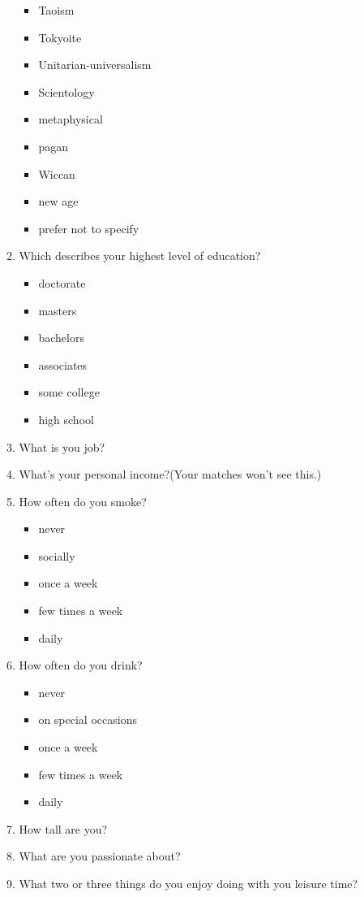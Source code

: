 \begin{appendices}
\begin{itemize}
\begin{enumerate}
\begin{itemize}
				\item Taoism
				\item Tokyoite
				\item Unitarian-universalism
				\item Scientology
				\item metaphysical
				\item pagan
				\item Wiccan
				\item new age
				\item prefer not to specify 
			\end{itemize}  
			\item Which describes your highest level of education?
			\begin{itemize}
				\item doctorate
				\item masters
				\item bachelors
				\item associates
				\item some college
				\item high school
			\end{itemize} 
			\item What is you job?
			\item What's your personal income?(Your matches won't see this.)
			\item How often do you smoke?
			\begin{itemize}
				\item never
				\item socially
				\item once a week
				\item few times a week
				\item daily
			\end{itemize}
			\item How often do you drink?
			\begin{itemize}
				\item never
				\item on special occasions
				\item once a week
				\item few times a week
				\item daily
			\end{itemize}
			\item How tall are you?
			\item What are you passionate about?
			\item What two or three things do you enjoy doing with you leisure time?

\end{enumerate}
\end{itemize}
\end{appendices}
